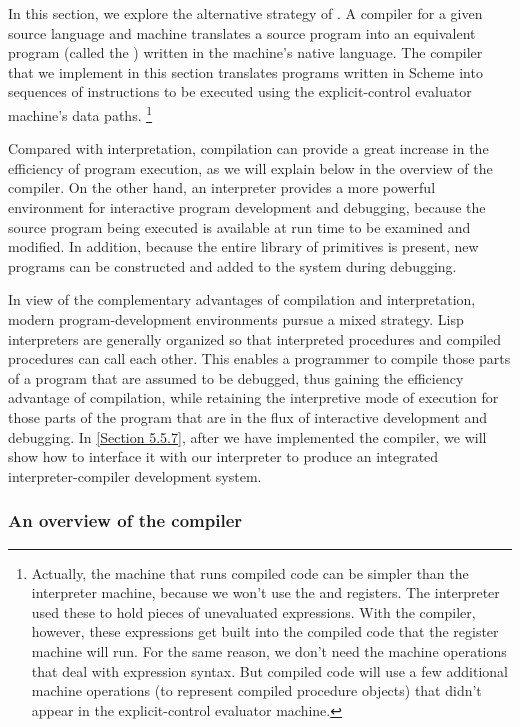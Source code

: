 In this section, we explore the alternative strategy of .
A compiler for a given source language and machine translates a source program into an equivalent program (called the ) written in the machine’s native language.
The compiler that we implement in this section translates programs written in Scheme into sequences of instructions to be executed using the explicit-control evaluator machine’s data paths.%
\footnote{
	Actually, the machine that runs compiled code can be simpler than the interpreter machine, because we won’t use the  and  registers.
	The interpreter used these to hold pieces of unevaluated expressions.
	With the compiler, however, these expressions get built into the compiled code that the register machine will run.
	For the same reason, we don’t need the machine operations that deal with expression syntax.
	But compiled code will use a few additional machine operations (to represent compiled procedure objects) that didn’t appear in the explicit-control evaluator machine.
}

Compared with interpretation, compilation can provide a great increase in the efficiency of program execution, as we will explain below in the overview of the compiler.
On the other hand, an interpreter provides a more powerful environment for interactive program development and debugging, because the source program being executed is available at run time to be examined and modified.
In addition, because the entire library of primitives is present, new programs can be constructed and added to the system during debugging.

In view of the complementary advantages of compilation and interpretation, modern program-development environments pursue a mixed strategy.
Lisp interpreters are generally organized so that interpreted procedures and compiled procedures can call each other.
This enables a programmer to compile those parts of a program that are assumed to be debugged, thus gaining the efficiency advantage of compilation, while retaining the interpretive mode of execution for those parts of the program that are in the flux of interactive development and debugging.
In \cref{Section 5.5.7}, after we have implemented the compiler, we will show how to interface it with our interpreter to produce an integrated interpreter-compiler development system.



\subsubsection*{An overview of the compiler}

